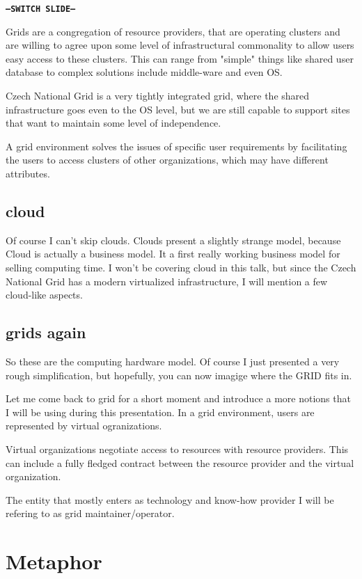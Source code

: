 \documentclass[12pt,a4paper]{article}
\begin{document}
\texttt{\textbf{---SWITCH SLIDE---}}

Grids are a congregation of resource providers, that are operating clusters and are willing to agree upon some level of infrastructural commonality to allow users easy access to these clusters.
This can range from "simple" things like shared user database to complex solutions include middle-ware and even OS.

Czech National Grid is a very tightly integrated grid, where the shared infrastructure goes even to the OS level, but we are still capable to support sites that want to maintain some level of independence.

A grid environment solves the issues of specific user requirements by facilitating the users to access clusters of other organizations, which may have different attributes.

\subsection{cloud}

Of course I can't skip clouds. Clouds present a slightly strange model, because Cloud is actually a business model. It a first really working business model for selling computing time.
I won't be covering cloud in this talk, but since the Czech National Grid has a modern virtualized infrastructure, I will mention a few cloud-like aspects.

\subsection{grids again}

So these are the computing hardware model. Of course I just presented a very rough simplification, but hopefully, you can now imagige where the GRID fits in.

Let me come back to grid for a short moment and introduce a more notions that I will be using during this presentation.
In a grid environment, users are represented by virtual ogranizations.

Virtual organizations negotiate access to resources with resource providers. This can include a fully fledged contract between the resource provider and the virtual organization.

The entity that mostly enters as technology and know-how provider I will be refering to as grid maintainer/operator.

\section{Metaphor}
\end{document}
